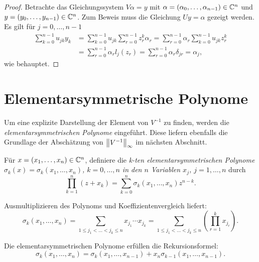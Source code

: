 \begin{proof}
    Betrachte das Gleichungssystem $V \alpha = y$ mit $\alpha = (\alpha_0,
    \dots, \alpha_{n-1}) \in \mathbb{C}^n$ und $y = (y_0, \dots, y_{n-1}) \in \mathbb{C}^n$.
    Zum Beweis muss die Gleichung $U y = \alpha$ gezeigt werden.
    Es gilt für $j = 0, \dots, n-1$
    \[
        \begin{split}
            \sum_{k=0}^{n-1} u_{jk} y_k &= \sum_{k=0}^{n-1} u_{jk} \sum_{r=0}^{n-1} z_r^k \alpha_r = \sum_{r=0}^{n-1} \alpha_r \sum_{k=0}^{n-1} u_{jk} z_r^k\\
                                        &= \sum_{r=0}^{n-1} \alpha_r l_j(z_r) = \sum_{r=0}^{n-1} \alpha_r \delta_{jr} = \alpha_j,
        \end{split}
    \]
    wie behauptet.
\end{proof}

\section{Elementarsymmetrische Polynome}
Um eine explizite Darstellung der Element von $V^{-1}$ zu finden, werden die
\emph{elementarsymmetrischen Polynome} eingeführt.
Diese liefern ebenfalls die Grundlage der Abschätzung von
$\left\lVert V^{-1} \right\rVert_\infty$ im nächsten Abschnitt.

\begin{mydef}
    Für $x = (x_1, \dots, x_{n}) \in \mathbb{C}^n$, definiere die
    \emph{k-ten elementarsymmetrischen Polynome
    $\sigma_{k}(x) = \sigma_{k}(x_1, \dots, x_{n})$, $k = 0, \dots, n$
    in den $n$ Variablen $x_j$, $j = 1, \dots, n$} durch
    \[
        \prod_{k=1}^{n} (z + x_k)
        = \sum_{k=0}^{n} \sigma_{k}(x_1, \dots, x_{n}) z^{n-k}.
    \]
\end{mydef}

\begin{remark}
    Ausmultiplizieren des Polynoms und Koeffizientenvergleich liefert:
    \begin{equation}
        \label{eq:explicit_elementary_symmetric_polynonimals}
        \sigma_{k}(x_1, \dots, x_{n})
        = \sum_{1 \leq j_1 < \dots < j_k \leq n} x_{j_1} \cdots x_{j_k}
        = \sum_{1 \leq j_1 < \dots < j_k \leq n} \left( \prod_{r=1}^k x_{j_r} \right).
    \end{equation}
\end{remark}

\begin{lemma}
    \label{lemma:recursion_elementary_symmetric_polynomials}
    Die elementarsymmetrischen Polynome erfüllen die Rekursionsformel:
    \begin{equation}
        \label{eq:recursion_elementary_symmetric_polynomials}
        \sigma_k (x_1, \dots, x_{n}) = \sigma_k (x_1, \dots, x_{n-1}) + x_{n} \sigma_{k-1} (x_1, \dots, x_{n-1}).
    \end{equation}
\end{lemma}

